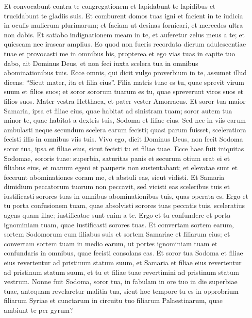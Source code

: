 \begin{biblechapter}
\verse Et convocabunt contra te congregationem et lapidabunt te lapidibus et trucidabunt te gladiis suis. 
\verse Et comburent domos tuas igni et facient in te iudicia in oculis mulierum plurimarum; et faciam ut desinas fornicari, et mercedes ultra non dabis. 
\verse Et satiabo indignationem meam in te, et auferetur zelus meus a te; et quiescam nec irascar amplius. 
\verse Eo quod non fueris recordata dierum adulescentiae tuae et provocasti me in omnibus his, propterea et ego vias tuas in capite tuo dabo, ait Dominus Deus, et non feci iuxta scelera tua in omnibus abominationibus tuis. 
\verse Ecce omnis, qui dicit vulgo proverbium in te, assumet illud dicens: “Sicut mater, ita et filia eius”. 
\verse Filia matris tuae es tu, quae sprevit virum suum et filios suos; et soror sororum tuarum es tu, quae spreverunt viros suos et filios suos. Mater vestra Hetthaea, et pater vester Amorraeus. 
\verse Et soror tua maior Samaria, ipsa et filiae eius, quae habitat ad sinistram tuam; soror autem tua minor te, quae habitat a dextris tuis, Sodoma et filiae eius.  
\verse Sed nec in viis earum ambulasti neque secundum scelera earum fecisti; quasi parum fuisset, sceleratiora fecisti illis in omnibus viis tuis. 
\verse Vivo ego, dicit Dominus Deus, non fecit Sodoma soror tua, ipsa et filiae eius, sicut fecisti tu et filiae tuae. 
\verse Ecce haec fuit iniquitas Sodomae, sororis tuae: superbia, saturitas panis et securum otium erat ei et filiabus eius, et manum egeni et pauperis non sustentabant; 
\verse et elevatae sunt et fecerunt abominationes coram me, et abstuli eas, sicut vidisti. 
\verse Et Samaria dimidium peccatorum tuorum non peccavit, sed vicisti eas sceleribus tuis et iustificasti sorores tuas in omnibus abominationibus tuis, quas operata es. 
\verse Ergo et tu porta confusionem tuam, quae absolvisti sorores tuas peccatis tuis, sceleratius agens quam illae; iustificatae sunt enim a te. Ergo et tu confundere et porta ignominiam tuam, quae iustificasti sorores tuas. 
\verse Et convertam sortem earum, sortem Sodomorum cum filiabus suis et sortem Samariae et filiarum eius; et convertam sortem tuam in medio earum, 
\verse ut portes ignominiam tuam et confundaris in omnibus, quae fecisti consolans eas. 
\verse Et soror tua Sodoma et filiae eius revertentur ad pristinum statum suum, et Samaria et filiae eius revertentur ad pristinum statum suum, et tu et filiae tuae revertimini ad pristinum statum vestrum. 
\verse Nonne fuit Sodoma, soror tua, in fabulam in ore tuo in die superbiae tuae, 
\verse antequam revelaretur malitia tua, sicut hoc tempore tu es in opprobrium filiarum Syriae et cunctarum in circuitu tuo filiarum Palaestinarum, quae ambiunt te per gyrum? 

\end{biblechapter}
